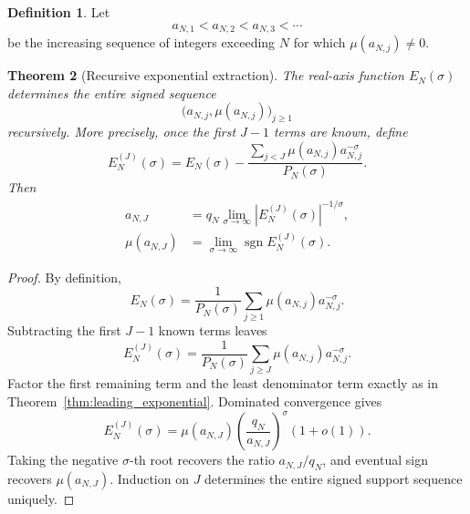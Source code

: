 \documentclass[11pt]{amsart}
\numberwithin{equation}{section}
\theoremstyle{plain}
\newtheorem{theorem}{Theorem}[section]
\theoremstyle{definition}
\newtheorem{definition}[theorem]{Definition}
\theoremstyle{remark}
\newcommand{\1}{\mathbf{1}}
\begin{document}
\begin{definition}
\label{def:tail_support_sequence}
Let
\begin{equation}
a_{N,1}<a_{N,2}<a_{N,3}<\cdots
\label{eq:tail_support_sequence}
\end{equation}
be the increasing sequence of integers exceeding $N$ for which
$\mu(a_{N,j})\neq0$.
\end{definition}

\begin{theorem}[Recursive exponential extraction]
\label{thm:recursive_extraction}
The real-axis function $E_N(\sigma)$ determines the entire signed sequence
\begin{equation}
\bigl(a_{N,j},\mu(a_{N,j})\bigr)_{j\geq1}
\label{eq:entire_tail_sequence}
\end{equation}
recursively.  More precisely, once the first $J-1$ terms are known, define
\begin{equation}
E_N^{(J)}(\sigma)
=
E_N(\sigma)-
\frac{\sum_{j<J}\mu(a_{N,j})a_{N,j}^{-\sigma}}{P_N(\sigma)}.
\label{eq:residual_tail_J}
\end{equation}
Then
\begin{align}
a_{N,J}
&=
q_N\lim_{\sigma\to\infty}
|E_N^{(J)}(\sigma)|^{-1/\sigma},
\label{eq:recursive_position}
\\
\mu(a_{N,J})
&=
\lim_{\sigma\to\infty}
\operatorname{sgn}E_N^{(J)}(\sigma).
\label{eq:recursive_sign}
\end{align}
\end{theorem}

\begin{proof}
By definition,
\begin{equation}
E_N(\sigma)
=
\frac{1}{P_N(\sigma)}
\sum_{j\geq1}\mu(a_{N,j})a_{N,j}^{-\sigma}.
\label{eq:recursive_full_expansion}
\end{equation}
Subtracting the first \(J-1\) known terms leaves
\begin{equation}
E_N^{(J)}(\sigma)
=
\frac{1}{P_N(\sigma)}
\sum_{j\geq J}\mu(a_{N,j})a_{N,j}^{-\sigma}.
\label{eq:recursive_residual_exact}
\end{equation}
Factor the first remaining term and the least denominator term exactly as
in Theorem~\ref{thm:leading_exponential}.  Dominated convergence gives
\begin{equation}
E_N^{(J)}(\sigma)
=
\mu(a_{N,J})
\left(\frac{q_N}{a_{N,J}}\right)^\sigma
(1+o(1)).
\label{eq:recursive_leading_asymptotic}
\end{equation}
Taking the negative \(\sigma\)-th root recovers the ratio
\(a_{N,J}/q_N\), and eventual sign recovers \(\mu(a_{N,J})\).  Induction
on \(J\) determines the entire signed support sequence uniquely.
\end{proof}
\end{document}
